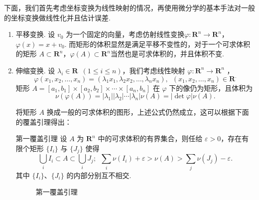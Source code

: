 下面，我们首先考虑坐标变换为线性映射的情况，再使用微分学的基本手法对一般的坐标变换做线性化并且估计误差.

\begin{enumerate}[label=(\arabic*)]
    \item 平移变换. 设 $v_0$ 为一个固定的向量，考虑仿射线性变换$\varphi\colon \mathbf{R}^n\to \mathbf{R}^n$，$\varphi(x) = x + v_0$. 而矩形的体积显然是满足平移不变性的，对于一个可求体积的矩形 $A\subset \mathbf{R}^n$，$\varphi(A)\subset \mathbf{R}^n$当然也是可求体积的，并且体积不变.

    \item 伸缩变换. 设 $\lambda_i\in\mathbf{R}\enspace(1\leqslant i\leqslant n)$，我们考虑线性映射 $\varphi\colon \mathbf{R}^n\to \mathbf{R}^n$ ，
          \[\varphi(x_1, x_2, \ldots, x_n) = (\lambda_1x_1, \lambda_2x_2, \ldots, \lambda_nx_n),\enspace (x_1, x_2, \ldots, x_n)\in \mathbf{R}^.\]
          矩形 $A = [a_1, b_1]\times [a_2, b_2]\times \cdots\times [a_n, b_n]$ 在 $\varphi$ 下的像仍为矩形，且体积为\[ \nu(\varphi(A)) = \vert\lambda_1\vert \vert\lambda_2\vert \cdots\vert\lambda_n\vert \nu(A) = \lvert \det\varphi\rvert \nu(A).\]

          将矩形 $A$ 换成一般的可求体积的图形，上述公式仍然成立，这可以根据下面的覆盖引理得出：

          \begin{lemma}{第一覆盖引理}{}
              设 $A$ 为 $\mathbf{R}^n$ 中的可求体积的有界集合，则任给 $\varepsilon > 0$，存在有限个矩形 $\{I_i\}$ 与 $\{J_j\}$ 使得
              \[\bigcup_i I_i\subset A\subset \bigcup_i J_j; \enspace \sum_i \nu(I_i) + \varepsilon > \nu(A) > \sum_j \nu(J_j) - \varepsilon.\]
              其中 $\{I_i\}$、$\{J_i\}$ 的内部分别互不相交.
          \end{lemma}

          \begin{figure}[h]
              \centering
              \caption{第一覆盖引理}
          \end{figure}


\end{enumerate}
